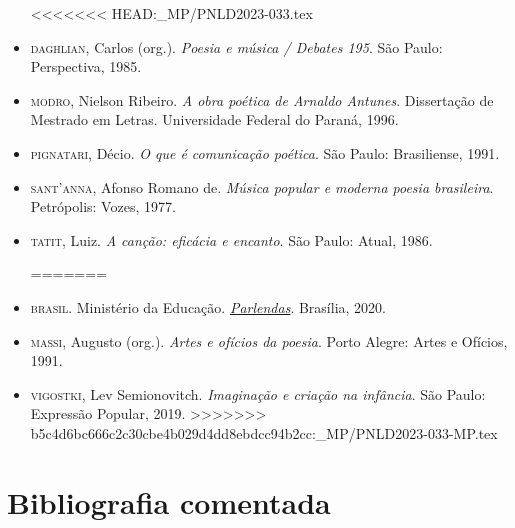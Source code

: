 \documentclass[11pt]{extarticle}
\begin{document}
\begin{itemize}
	
<<<<<<< HEAD:_MP/PNLD2023-033.tex
	\item \textsc{daghlian}, Carlos (org.). \textit{Poesia e música / Debates 195}. São Paulo: Perspectiva,
1985.

\item \textsc{modro}, Nielson Ribeiro. \textit{A obra poética de Arnaldo Antunes}. Dissertação de Mestrado em Letras. 
Universidade Federal do Paraná, 1996.

\item \textsc{pignatari}, Décio. \textit{O que é comunicação poética}. São Paulo: Brasiliense, 1991.

\item \textsc{sant'anna}, Afonso Romano de. \textit{Música popular e moderna poesia brasileira}. Petrópolis: Vozes, 1977.

\item \textsc{tatit}, Luiz. \textit{A canção: eficácia e encanto}. São Paulo: Atual, 1986.

=======
\item \textsc{brasil}. Ministério da Educação. \href{http://alfabetizacao.mec.gov.br/images/conta-pra-mim/livros/versao_digital/parlendas_versao_digital.pdf}{\textit{Parlendas}}. Brasília, 2020. 

\item \textsc{massi}, Augusto (org.). \emph{Artes e ofícios da poesia}. Porto Alegre:
  Artes e Ofícios, 1991.

\item \textsc{vigostki}, Lev Semionovitch. \textit{Imaginação e criação na infância}. São Paulo: Expressão Popular, 2019.
>>>>>>> b5c4d6bc666c2c30cbe4b029d4dd8ebdcc94b2cc:_MP/PNLD2023-033-MP.tex
\end{itemize}

\section{Bibliografia comentada}
\end{document}
